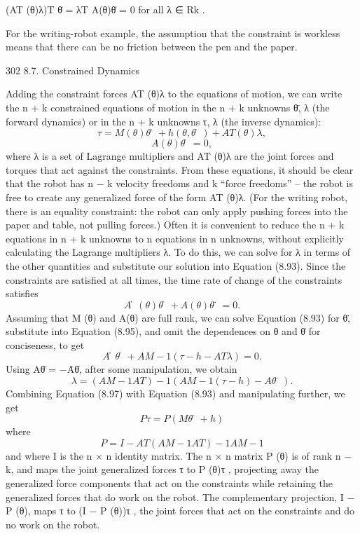 \documentclass[12pt,a4paper]{article}
\begin{document}
                     (AT (θ)λ)T θ̇ = λT A(θ)θ̇ = 0              for all λ ∈ Rk .

For the writing-robot example, the assumption that the constraint is workless
means that there can be no friction between the pen and the paper.


302                                                                   8.7. Constrained Dynamics

   Adding the constraint forces AT (θ)λ to the equations of motion, we can
write the n + k constrained equations of motion in the n + k unknowns {θ̈, λ}
(the forward dynamics) or in the n + k unknowns {τ, λ} (the inverse dynamics):
\begin{equation}
τ      = M (θ)θ̈ + h(θ, θ̇) + AT (θ)λ,
\label{eq:8.93}
\end{equation}
\begin{equation}
A(θ)θ̇     = 0,
\label{eq:8.94}
\end{equation}
where λ is a set of Lagrange multipliers and AT (θ)λ are the joint forces and
torques that act against the constraints. From these equations, it should be
clear that the robot has n − k velocity freedoms and k “force freedoms” – the
robot is free to create any generalized force of the form AT (θ)λ. (For the writing
robot, there is an equality constraint: the robot can only apply pushing forces
into the paper and table, not pulling forces.)
    Often it is convenient to reduce the n + k equations in n + k unknowns to n
equations in n unknowns, without explicitly calculating the Lagrange multipliers
λ. To do this, we can solve for λ in terms of the other quantities and substitute
our solution into Equation (8.93). Since the constraints are satisfied at all times,
the time rate of change of the constraints satisfies
\begin{equation}
Ȧ(θ)θ̇ + A(θ)θ̈ = 0.
\label{eq:8.95}
\end{equation}
Assuming that M (θ) and A(θ) are full rank, we can solve Equation (8.93) for
θ̈, substitute into Equation (8.95), and omit the dependences on θ and θ̇ for
conciseness, to get
\begin{equation}
Ȧθ̇ + AM −1 (τ − h − AT λ) = 0.
\label{eq:8.96}
\end{equation}
Using Aθ̈ = −Ȧθ̇, after some manipulation, we obtain
\begin{equation}
λ = (AM −1 AT )−1 (AM −1 (τ − h) − Aθ̈).
\label{eq:8.97}
\end{equation}
Combining Equation (8.97) with Equation (8.93) and manipulating further, we
get
\begin{equation}
P τ = P (M θ̈ + h)
\label{eq:8.98}
\end{equation}
where
\begin{equation}
P = I − AT (AM −1 AT )−1 AM −1
\label{eq:8.99}
\end{equation}
and where I is the n × n identity matrix. The n × n matrix P (θ) is of rank
n − k, and maps the joint generalized forces τ to P (θ)τ , projecting away the
generalized force components that act on the constraints while retaining the
generalized forces that do work on the robot. The complementary projection,
I − P (θ), maps τ to (I − P (θ))τ , the joint forces that act on the constraints and
do no work on the robot.
\end{document}
